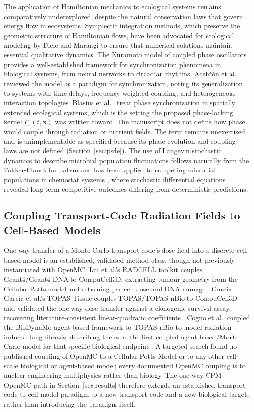 \documentclass[11pt]{article}
\begin{document}
The application of Hamiltonian mechanics to ecological systems remains comparatively
underexplored, despite the natural conservation laws that govern energy flow in ecosystems.
Symplectic integration methods, which preserve the geometric structure of Hamiltonian flows,
have been advocated for ecological modeling by Diele and Marangi \cite{diele2015} to ensure that
numerical solutions maintain essential qualitative dynamics. The Kuramoto model of coupled phase
oscillators \cite{kuramoto1984} provides a well-established framework for synchronization
phenomena in biological systems, from neural networks to circadian rhythms. Aceb\'r\'on et al.\
\cite{acebron2005} reviewed the model as a paradigm for synchronization, noting its
generalization to systems with time delays, frequency-weighted coupling, and heterogeneous
interaction topologies. Blasius et al.\ \cite{blasius1999} treat phase synchronization in
spatially extended ecological systems, which is the setting the proposed phase-locking kernel
$\Gamma_s(t,\mathbf{x})$ was written toward. The manuscript does not define how phase would couple
through radiation or nutrient fields. The term remains unexercised and is unimplementable as
specified because its phase evolution and coupling laws are not defined
(Section~\ref{sec:psde}). The use of Langevin stochastic dynamics to describe microbial population
fluctuations follows naturally from the Fokker-Planck formalism and has been applied to
competing microbial populations in chemostat systems \cite{campillo2017}, where stochastic
differential equations revealed long-term competitive outcomes differing from deterministic
predictions.

\subsection{Coupling Transport-Code Radiation Fields to Cell-Based Models}

One-way transfer of a Monte Carlo transport code's dose field into a discrete cell-based model
is an established, validated method class, though not previously instantiated with OpenMC.
Liu et al.'s RADCELL toolkit couples Geant4/Geant4-DNA to CompuCell3D, extracting tumour
geometry from the Cellular Potts model and returning per-cell dose and DNA damage
\cite{radcell2021}. Garc\'{i}a Garc\'{i}a et al.'s TOPAS-Tissue couples TOPAS/TOPAS-nBio to
CompuCell3D and validated the one-way dose transfer against a clonogenic survival assay,
recovering literature-consistent linear-quadratic coefficients \cite{garciagarcia2024}. Cogno
et al.\ coupled the BioDynaMo agent-based framework to TOPAS-nBio to model radiation-induced
lung fibrosis, describing theirs as the first coupled agent-based/Monte-Carlo model for that
specific biological endpoint \cite{cogno2024}. A targeted search found no published coupling
of OpenMC to a Cellular Potts Model or to any other cell-scale biological or agent-based
model; every documented OpenMC coupling is to nuclear-engineering multiphysics rather than
biology. The one-way CPM--OpenMC path in Section~\ref{sec:results} therefore extends an
established transport-code-to-cell-model paradigm to a new transport code and a new
biological target, rather than introducing the paradigm itself.
\end{document}
